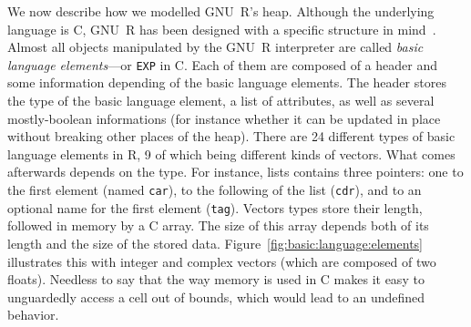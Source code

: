 \documentclass[
    sigplan,
    10pt,
    review, %
    natbib=false %
 ]{acmart}
\begin{document}
We now describe how we modelled GNU~R's heap.
Although the underlying language is C,
GNU~R has been designed with a specific structure in mind~\parencite{R}.
Almost all objects manipulated by the GNU~R interpreter
are called \emph{basic language elements}---or \texttt{EXP} in C.
Each of them are composed of a header and some information depending
of the basic language elements.
%
The header stores the type of the basic language element,
a list of attributes,
as well as several mostly-boolean informations
(for instance whether it can be updated in place
without breaking other places of the heap).
There are 24 different types of basic language elements in R,
9 of which being different kinds of vectors.
%
What comes afterwards depends on the type.
For instance, lists contains three pointers:
one to the first element (named \texttt{car}),
to the following of the list (\texttt{cdr}),
and to an optional name for the first element (\texttt{tag}).
Vectors types store their length,
followed in memory by a C array.
The size of this array depends both of its length
and the size of the stored data.
Figure~\ref{fig:basic:language:elements} illustrates this
with integer and complex vectors (which are composed of two floats).
%
Needless to say that the way memory is used in C
makes it easy to unguardedly access a cell out of bounds,
which would lead to an undefined behavior.
\end{document}
